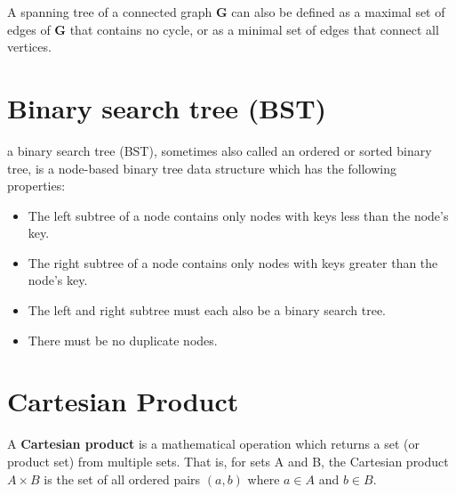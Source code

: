 \documentclass[]{article}
\begin{document}
A spanning tree of a connected graph \textbf{G} can also be defined as a maximal set of edges of \textbf{G} that contains no cycle, or as a minimal set of edges that connect all vertices.


\section{Binary search tree (BST)}
a binary search tree (BST), sometimes also called an ordered or sorted binary tree, is a node-based binary tree data structure which has the following properties:

\begin{itemize}
\item The left subtree of a node contains only nodes with keys less than the node's key.
\item The right subtree of a node contains only nodes with keys greater than the node's key.
\item The left and right subtree must each also be a binary search tree.
\item There must be no duplicate nodes.
\end{itemize}

\section{Cartesian Product}
 A \textbf{Cartesian product} is a mathematical operation which returns a set (or product set) from multiple sets. That is, for sets A and B, the Cartesian product $A \times B$ is the set of all ordered pairs $(a, b)$ where $a \in A$ and $b \in B$.
\end{document}

